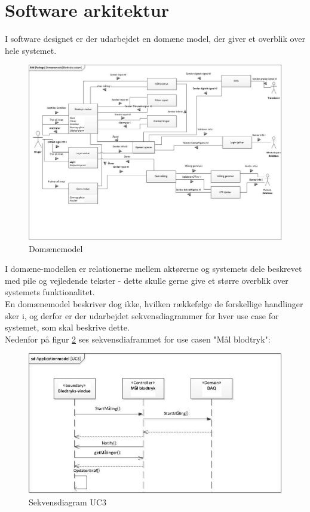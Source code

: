 \section{Software arkitektur}\label{Software arkitektur}
   I software designet er der udarbejdet en domæne model, der giver et overblik over hele systemet.
   
 \begin{figure}[H]
	\centering
	\includegraphics[width=1\textwidth]{Figurer/ISE/Domaenemodel}
	\caption{Domænemodel}
	\label{domaenemodel}
\end{figure}

I domæne-modellen er relationerne mellem aktørerne og systemets dele beskrevet med pile og vejledende tekster - dette skulle gerne give et større overblik over systemets funktionalitet. \\ 
En domænemodel beskriver dog ikke, hvilken rækkefølge de forskellige handlinger sker i, og derfor er der udarbejdet sekvensdiagrammer for hver use case for systemet, som skal beskrive dette.\\
Nedenfor på figur \ref{sekvensdiagram} ses sekvensdiaframmet for use casen "Mål blodtryk":

\begin{figure}[H]
	\centering
	\includegraphics[width=1\textwidth]{Figurer/ISE/sdAppModelUC3}
	\caption{Sekvensdiagram UC3}
	\label{sekvensdiagram}
\end{figure}

